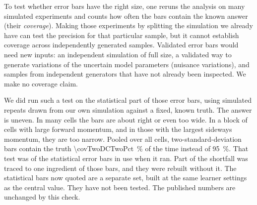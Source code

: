 To test whether error bars have the right size, one reruns the analysis on many simulated experiments and counts how often the bars contain the known answer (their \emph{coverage}). Making those experiments by splitting the simulation we already have can test the precision for that particular sample, but it cannot establish coverage across independently generated samples. Validated error bars would need new inputs: an independent simulation of full size, a validated way to generate variations of the uncertain model parameters (nuisance variations), and samples from independent generators that have not already been inspected. We make no coverage claim.

We did run such a test on the statistical part of those error bars, using simulated repeats drawn from our own simulation against a fixed, known truth. The answer is uneven. In many cells the bars are about right or even too wide. In a block of cells with large forward momentum, and in those with the largest sideways momentum, they are too narrow. Pooled over all cells, two-standard-deviation bars contain the truth \SI{\covTwoDCTwoPct}{\percent} of the time instead of \SI{95}{\percent}. That test was of the statistical error bars in use when it ran. Part of the shortfall was traced to one ingredient of those bars, and they were rebuilt without it. The statistical bars now quoted are a separate set, built at the same learner settings as the central value. They have not been tested. The published numbers are unchanged by this check.

